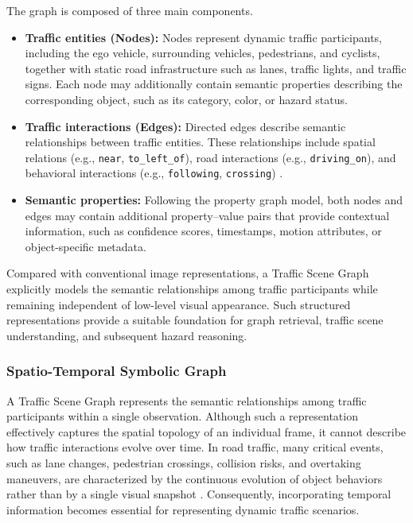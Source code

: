 \documentclass[a4paper, 11pt]{article} %
\begin{document}
The graph is composed of three main components.

\begin{itemize}
    \item \textbf{Traffic entities (Nodes):} Nodes represent dynamic traffic participants, including the ego vehicle, surrounding vehicles, pedestrians, and cyclists, together with static road infrastructure such as lanes, traffic lights, and traffic signs. Each node may additionally contain semantic properties describing the corresponding object, such as its category, color, or hazard status.

    \item \textbf{Traffic interactions (Edges):} Directed edges describe semantic relationships between traffic entities. These relationships include spatial relations (e.g., \texttt{near}, \texttt{to\_left\_of}), road interactions (e.g., \texttt{driving\_on}), and behavioral interactions (e.g., \texttt{following}, \texttt{crossing}) \cite{tian2025query,zhou2024hktsg}.

    \item \textbf{Semantic properties:} Following the property graph model, both nodes and edges may contain additional property--value pairs that provide contextual information, such as confidence scores, timestamps, motion attributes, or object-specific metadata.
\end{itemize}

Compared with conventional image representations, a Traffic Scene Graph explicitly models the semantic relationships among traffic participants while remaining independent of low-level visual appearance. Such structured representations provide a suitable foundation for graph retrieval, traffic scene understanding, and subsequent hazard reasoning.

\subsubsection{Spatio-Temporal Symbolic Graph}

A Traffic Scene Graph represents the semantic relationships among traffic participants within a single observation. Although such a representation effectively captures the spatial topology of an individual frame, it cannot describe how traffic interactions evolve over time. In road traffic, many critical events, such as lane changes, pedestrian crossings, collision risks, and overtaking maneuvers, are characterized by the continuous evolution of object behaviors rather than by a single visual snapshot \cite{bao2020uncertainty,zhou2024hktsg}. Consequently, incorporating temporal information becomes essential for representing dynamic traffic scenarios.
\end{document}
